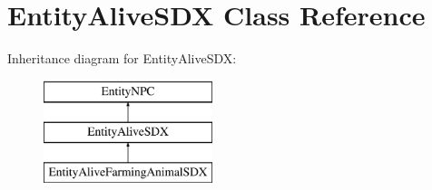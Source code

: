 \hypertarget{class_entity_alive_s_d_x}{}\section{Entity\+Alive\+S\+DX Class Reference}
\label{class_entity_alive_s_d_x}
Inheritance diagram for Entity\+Alive\+S\+DX\+:\begin{figure}[H]
\begin{center}
\leavevmode
\includegraphics[height=3.000000cm]{class_entity_alive_s_d_x}
\end{center}
\end{figure}
